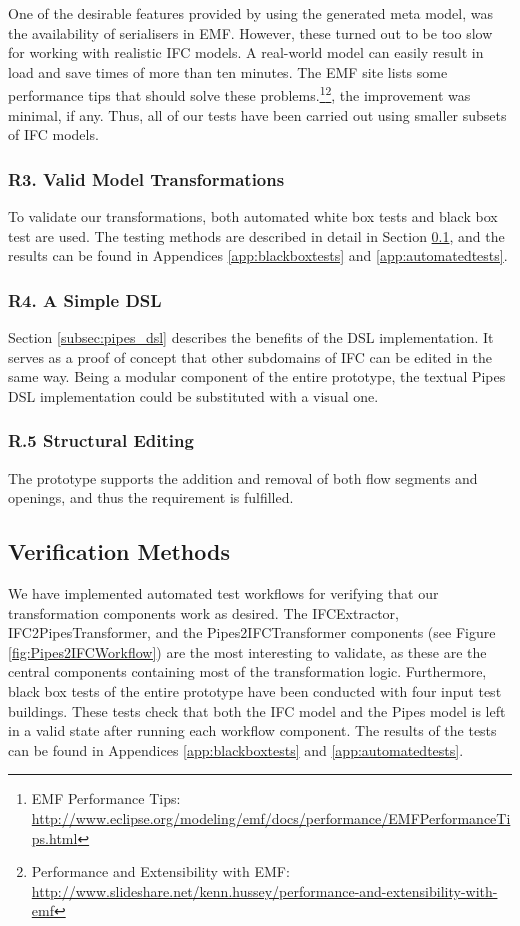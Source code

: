One of the desirable features provided by using the generated meta model, was the availability of serialisers in EMF. However, these turned out to be too slow for working with realistic IFC models. A real-world model can easily result in load and save times of more than ten minutes. The EMF site lists some performance tips that should solve these problems.\footnote{EMF Performance Tips: \url{http://www.eclipse.org/modeling/emf/docs/performance/EMFPerformanceTips.html}}\footnote{Performance and Extensibility with EMF: \url{http://www.slideshare.net/kenn.hussey/performance-and-extensibility-with-emf}}, the improvement was minimal, if any. Thus, all of our tests have been carried out using smaller subsets of IFC models. 

\subsubsection{R3. Valid Model Transformations} 
To validate our transformations, both automated white box tests and black box test are used. The testing methods are described in detail in Section \ref{subsec:verification_methods}, and the results can be found in Appendices \ref{app:blackboxtests} and \ref{app:automatedtests}.

\subsubsection{R4. A Simple DSL} Section \ref{subsec:pipes_dsl} describes the benefits of the DSL implementation. It serves as a proof of concept that other subdomains of IFC can be edited in the same way. Being a modular component of the entire prototype, the textual Pipes DSL implementation could be substituted with a visual one.

\subsubsection{R.5 Structural Editing}
The prototype supports the addition and removal of both flow segments and openings, and thus the requirement is fulfilled.

\subsection{Verification Methods}
\label{subsec:verification_methods}
We have implemented automated test workflows for verifying that our transformation components work as desired. The IFCExtractor, IFC2PipesTransformer, and the Pipes2IFCTransformer components (see Figure \ref{fig:Pipes2IFCWorkflow}) are the most interesting to validate, as these are the central components containing most of the transformation logic. Furthermore, black box tests of the entire prototype have been conducted with four input test buildings. These tests check that both the IFC model and the Pipes model is left in a valid state after running each workflow component. The results of the tests can be found in Appendices \ref{app:blackboxtests} and \ref{app:automatedtests}.

